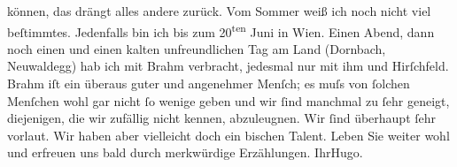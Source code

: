 \begin{ledgroupsized}[t]{13cm}
               können, das drängt alles andere zurück.\pend
           \pstart
           Vom Sommer weiß ich noch nicht viel beſtimmtes. Jedenfalls bin ich bis zum
                     20\textsuperscript{ten} Juni in Wien. Einen Abend, dann noch einen und einen kalten
               unfreundlichen Tag am Land (Dornbach, Neuwaldegg) hab ich mit Brahm verbracht, jedesmal {\pb}nur mit ihm und Hirſchfeld. Brahm iſt ein überaus guter und angenehmer Menſch; es muſs von ſolchen
               Menſchen wohl gar nicht ſo wenige geben und wir ſind manchmal zu ſehr geneigt,
               diejenigen, die wir zufällig nicht kennen, abzuleugnen. Wir ſind überhaupt ſehr
               vorlaut. Wir haben aber vielleicht doch ein bischen Talent.\pend
           \pstart
           Leben Sie weiter wohl und erfreuen uns bald durch merkwürdige Erzählungen.\pend
           \pstart Ihr\spacefill\mbox{Hugo.}\pend{}
         
         \endnumbering{}\end{ledgroupsized}  \newcommand{\dateiname}{L00677}\newcommand{\titel}{Hugo von Hofmannsthal an Arthur Schnitzler, 17. 5. [1897]}\newcommand{\editorInnen}{Martin Anton Müller und Gerd-Hermann Susen}
      